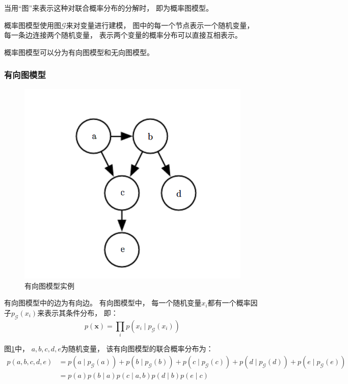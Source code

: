 当用“图”来表示这种对联合概率分布的分解时，
即为概率图模型。

概率图模型使用图{$\mathcal{G} $}来对变量进行建模，
图中的每一个节点表示一个随机变量，
每一条边连接两个随机变量，
表示两个变量的概率分布可以直接互相表示。

概率图模型可以分为有向图模型和无向图模型。
\subsubsection{有向图模型}
\begin{figure}[ht]
    \centering
    \includegraphics[height=0.3\textheight]{figures/directed_graph_model}
    \caption{有向图模型实例}\label{fig:directed_graph_model}
\end{figure}
有向图模型中的边为有向边。
有向图模型中，
每一个随机变量{$x_i$}都有一个概率因子{$p_{\mathcal{G}}(x_i)$}来表示其条件分布，
即：
\begin{equation}
    \label{eq:directed_graph_model}
    p(\bm{x})=\prod_{i} p(x_i \mid p_{\mathcal{G}}(x_i))
\end{equation}



图{\ref{fig:directed_graph_model}}中，
{$a,b,c,d,e$}为随机变量，
该有向图模型的联合概率分布为：
\begin{align}
    p(a,b,c,d,e)
    &=p(a \mid p_{\mathcal{G}}(a)) + 
    p(b \mid p_{\mathcal{G}}(b)) + 
    p(c \mid p_{\mathcal{G}}(c)) + 
    p(d \mid p_{\mathcal{G}}(d)) +
    p(e \mid p_{\mathcal{G}}(e)) \\
    &=p(a) p(b \mid a) p(c \mid a,b) p(d \mid b) p(e \mid c)
\end{align}


